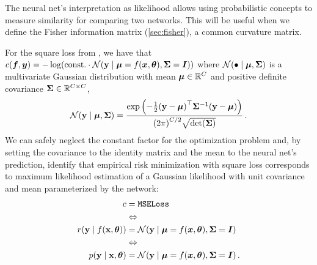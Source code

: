 The neural net's interpretation as likelihood allows using probabilistic concepts to measure similarity for comparing two networks.
This will be useful when we define the Fisher information matrix (\cref{sec:fisher}), a common curvature matrix.

\switchcolumn[1]
\begin{example}\label{ex:square_loss_probabilistic}
  For the square loss from , we have that $c({\bm{f}}, {\bm{y}}) = - \log( \mathrm{const.}
  \cdot {\mathcal{N}}({\mathbf{y}} \mid {\bm{\mu}} = f({\bm{x}}, {\bm{\theta}}), {\bm{\Sigma}} = {\bm{I}}))$ where ${\mathcal{N}}(\bullet \mid {\bm{\mu}}, {\bm{\Sigma}})$ is a multivariate Gaussian distribution with mean ${\bm{\mu}} \in {\mathbb{R}}^C$ and positive definite covariance ${\bm{\Sigma}} \in {\mathbb{R}}^{C \times C}$,
  \begin{align*}
    {\mathcal{N}}({\mathbf{y}} \mid {\bm{\mu}}, {\bm{\Sigma}})
    =
    \frac{
    \exp\left( -\frac{1}{2} {({\mathbf{y}} - {\bm{\mu}})}^\top {\bm{\Sigma}}^{-1} ({\mathbf{y}} - {\bm{\mu}}) \right)
    }{{(2\pi)}^{C/2} \sqrt{\det({\bm{\Sigma}})}}\,.
  \end{align*}
  We can safely neglect the constant factor for the optimization problem and, by setting the covariance to the identity matrix and the mean to the neural net's prediction, identify that empirical risk minimization with square loss corresponds to maximum likelihood estimation of a Gaussian likelihood with unit covariance and mean parameterized by the network:
  \begin{align*}
    c                             & = \text{\texttt{MSELoss}}
    \\
                                  & \Leftrightarrow
    \\
    r({\mathbf{y}} \mid f({\mathbf{x}}, {\bm{\theta}})) & = {\mathcal{N}}({\mathbf{y}} \mid {\bm{\mu}} = f({\bm{x}}, {\bm{\theta}}), {\bm{\Sigma}} = {\bm{I}})\,
    \\
                                  & \Leftrightarrow
    \\
    p({\mathbf{y}} \mid {\mathbf{x}}, {\bm{\theta}})    & = {\mathcal{N}}({\mathbf{y}} \mid {\bm{\mu}} = f({\bm{x}}, {\bm{\theta}}), {\bm{\Sigma}} = {\bm{I}})\,.
  \end{align*}
\end{example}

